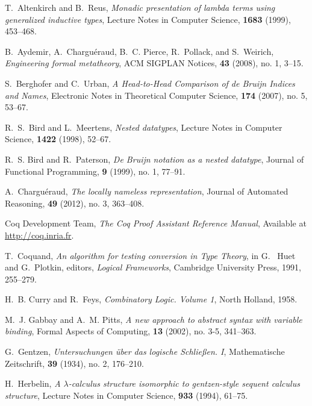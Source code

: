 \documentclass{kms-j}
\theoremstyle{plain}
\theoremstyle{remark}
\begin{document}
\begin{thebibliography}{10}

T.~Altenkirch and B.~Reus, {\it {Monadic presentation of lambda terms
  using generalized inductive types}}, Lecture Notes in Computer Science,
  {\bf 1683} (1999), 453--468.

B.~Aydemir, A.~Chargu{\'{e}}raud, B.~C. Pierce, R.~Pollack, and
  S.~Weirich, {\it {Engineering formal metatheory}}, ACM SIGPLAN Notices, {\bf
  43} (2008), no. 1, 3--15.

S.~Berghofer and C.~Urban, {\it {A Head-to-Head Comparison of de Bruijn Indices and Names}},
Electronic Notes in Theoretical Computer Science, {\bf 174} (2007), no. 5, 53--67.

R.~S.~Bird and L.~Meertens, {\it {Nested datatypes}},
Lecture Notes in Computer Science, {\bf 1422} (1998), 52--67.

R.~S. Bird and R.~Paterson, {\it {De Bruijn notation as a nested
  datatype}}, Journal of Functional Programming, {\bf 9} (1999), no. 1, 77--91.

A.~Chargu{\'{e}}raud, {\it {The locally nameless representation}},
  Journal of Automated Reasoning, {\bf 49} (2012), no. 3, 363--408.

Coq Development Team, {\it {The Coq Proof Assistant Reference Manual}},
  Available at \url{http://coq.inria.fr}.

T.~Coquand, {\it {An algorithm for testing conversion in Type Theory}},
  in G.~ Huet and G.~Plotkin, editors,
  {\it Logical Frameworks},  Cambridge University Press, 1991, 255--279.

H.~B. Curry and R.~Feys, {\it {Combinatory Logic. Volume 1}}, North
  Holland, 1958.

M.~J. Gabbay and A.~M. Pitts, {\it {A new approach to abstract syntax
  with variable binding}}, Formal Aspects of Computing, {\bf 13} (2002), no. 3-5,
  341--363.

G.~Gentzen, {\it {Untersuchungen {\"{u}}ber das logische Schlie{\ss}en.
  I}}, Mathematische Zeitschrift, {\bf 39} (1934), no. 2, 176--210.

H.~Herbelin, {\it A $\lambda$-calculus structure isomorphic to
  gentzen-style sequent calculus structure},
  Lecture Notes in Computer Science, {\bf 933} (1994), 61--75.


\end{thebibliography}
\end{document}
